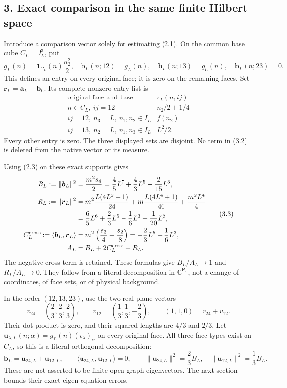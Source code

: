 \documentclass[
  11pt,
]{article}
\begin{document}
\subsection{3. Exact comparison in the same finite Hilbert
space}\label{magnetic-part-8-exact-comparison-in-the-same-finite-hilbert-space}

Introduce a comparison vector solely for estimating (2.1). On the common
base cube \(C_L=I_L^3\), put \[
g_L(n)=\mathbf1_{C_L}(n)\frac{n_2^2}{2},
\quad
\boldsymbol b_L(n;12)=g_L(n),\quad
\boldsymbol b_L(n;13)=g_L(n),\quad
\boldsymbol b_L(n;23)=0.
\tag{3.1}
\] This defines an entry on every original face; it is zero on the
remaining faces. Set
\(\boldsymbol r_L=\boldsymbol a_L-\boldsymbol b_L\). Its complete
nonzero-entry list is \[
\begin{array}{c|c}
\text{original face and base}&r_L(n;ij)\\ \hline
n\in C_L,\ ij=12&n_2/2+1/4\\
ij=12,\ n_3=L,\ n_1,n_2\in I_L&f(n_2)\\
ij=13,\ n_2=L,\ n_1,n_3\in I_L&L^2/2.
\end{array}
\tag{3.2}
\] Every other entry is zero. The three displayed sets are disjoint. No
term in (3.2) is deleted from the native vector or its measure.

Using (2.3) on these exact supports gives \[
\begin{split}
B_L:=\|\boldsymbol b_L\|^2
 &=\frac{m^2s_4}{2}
   =\frac45L^7+\frac43L^5-\frac2{15}L^3,\\
R_L:=\|\boldsymbol r_L\|^2
 &=m^2\frac{L(4L^2-1)}{24}
   +m\frac{L(4L^4+1)}{40}+\frac{m^2L^4}{4}\\
 &=\frac65L^6+\frac23L^5-\frac16L^3+\frac1{20}L^2,\\
C_L^{\rm cross}:=\langle\boldsymbol b_L,\boldsymbol r_L\rangle
 &=m^2\left(\frac{s_3}{4}+\frac{s_2}{8}\right)
   =-\frac23L^5+\frac16L^3,\\
A_L&=B_L+2C_L^{\rm cross}+R_L.
\end{split}
\tag{3.3}
\] The negative cross term is retained. These formulas give
\(B_L/A_L\to1\) and \(R_L/A_L\to0\). They follow from a literal
decomposition in \(\mathbb C^{\mathsf P_L}\), not a change of
coordinates, of face sets, or of physical background.

In the order \((12,13,23)\), use the two real plane vectors \[
v_{24}=\left(\frac23,\frac23,\frac23\right),\qquad
v_{12}=\left(\frac13,\frac13,-\frac23\right),\qquad
(1,1,0)=v_{24}+v_{12}.
\tag{3.4}
\] Their dot product is zero, and their squared lengths are \(4/3\) and
\(2/3\). Let \(\boldsymbol u_{\lambda,L}(n;\alpha)
=g_L(n)(v_\lambda)_\alpha\) on every original face. All three face types
exist on \(C_L\), so this is a literal orthogonal decomposition: \[
\boldsymbol b_L=\boldsymbol u_{24,L}+\boldsymbol u_{12,L},\qquad
\langle\boldsymbol u_{24,L},\boldsymbol u_{12,L}\rangle=0,
\qquad
\|\boldsymbol u_{24,L}\|^2=\frac23B_L,\quad
\|\boldsymbol u_{12,L}\|^2=\frac13B_L.
\tag{3.5}
\] These are not asserted to be finite-open-graph eigenvectors. The next
section bounds their exact eigen-equation errors.
\end{document}
